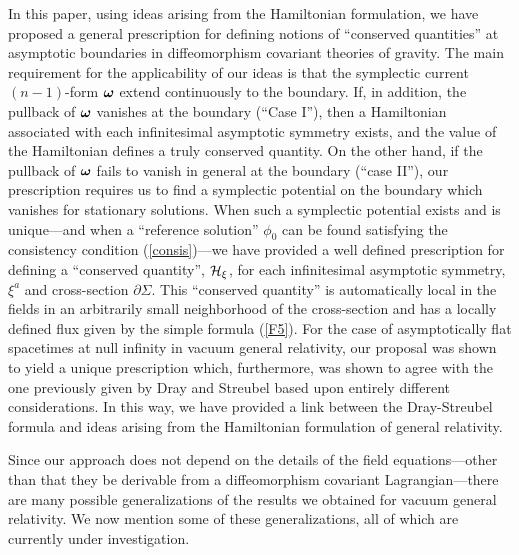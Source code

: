 In this paper, using ideas arising from the Hamiltonian formulation,
we have proposed a general prescription for defining notions of
``conserved quantities'' at asymptotic boundaries in diffeomorphism
covariant theories of gravity. The main requirement for the
applicability of our ideas is that the symplectic current $(n-1)$-form
${\mbox{\boldmath $\omega$}}$ extend continuously to the boundary. If,
in addition, the pullback of ${\mbox{\boldmath $\omega$}}$ vanishes at
the boundary (``Case I''), then a Hamiltonian associated with each
infinitesimal asymptotic symmetry exists, and the value of the
Hamiltonian defines a truly conserved quantity. On the other hand, if
the pullback of ${\mbox{\boldmath $\omega$}}$ fails to vanish in
general at the boundary (``case II''), our prescription requires us to
find a symplectic potential on the boundary which vanishes for
stationary solutions. When such a symplectic potential exists and is
unique---and when a ``reference solution'' $\phi_0$ can be found
satisfying the consistency condition (\ref{consis})---we have provided
a well defined prescription for defining a ``conserved quantity'',
${\cal H}_\xi$, for each infinitesimal asymptotic symmetry, $\xi^a$ and
cross-section $\partial \Sigma$. This ``conserved quantity'' is
automatically local in the fields in an arbitrarily small neighborhood
of the cross-section and has a locally defined flux given by the
simple formula (\ref{F5}). For the case of asymptotically flat
spacetimes at null infinity in vacuum general relativity, our proposal
was shown to yield a unique prescription which, furthermore, was shown
to agree with the one previously given by Dray and Streubel \cite{ds}
based upon entirely different considerations. In this way, we have
provided a link between the Dray-Streubel formula and ideas arising
from the Hamiltonian formulation of general relativity.

Since our approach does not depend on the details of the field
equations---other than that they be derivable from a diffeomorphism
covariant Lagrangian---there are many possible generalizations of the
results we obtained for vacuum general relativity. We now mention some
of these generalizations, all of which are currently under
investigation.

